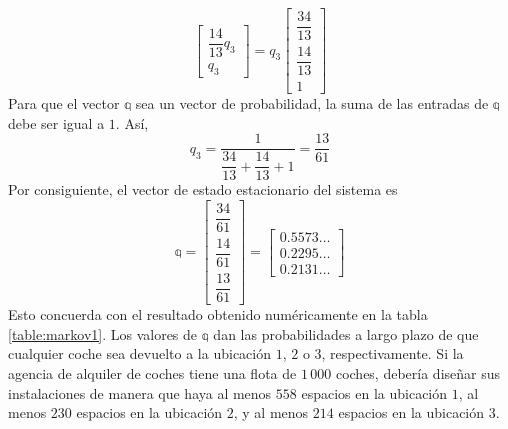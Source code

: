 \begin{example}
$$\begin{bmatrix}
        \dfrac{14}{13} q_3 \\[3mm]
        q_3
    \end{bmatrix} = q_3 \begin{bmatrix}
        \dfrac{34}{13} \\[3mm] 
        \dfrac{14}{13} \\[3mm]
        1
    \end{bmatrix}$$
    Para que el vector $\mathbb{q}$ sea un vector de probabilidad, la suma de las entradas de $\mathbb{q}$ debe ser igual a $1$. Así,
    $$q_3 = \frac{1}{\dfrac{34}{13} + \dfrac{14}{13} + 1} = \frac{13}{61}$$
    Por consiguiente, el vector de estado estacionario del sistema es
    $$\mathbb{q} = \begin{bmatrix}
        \dfrac{34}{61} \\[2mm]
        \dfrac{14}{61} \\[2mm]
        \dfrac{13}{61}
    \end{bmatrix} = \begin{bmatrix}
        0.5573 \dots \\
        0.2295 \dots \\
        0.2131 \dots
    \end{bmatrix}$$
    Esto concuerda con el resultado obtenido numéricamente en la tabla \ref{table:markov1}. Los valores de $\mathbb{q}$ dan las probabilidades a largo plazo de que cualquier coche sea devuelto a la ubicación $1$, $2$ o $3$, respectivamente. Si la agencia de alquiler de coches tiene una flota de $1 \, 000$ coches, debería diseñar sus instalaciones de manera que haya al menos $558$ espacios en la ubicación $1$, al menos $230$ espacios en la ubicación $2$, y al menos $214$ espacios en la ubicación $3$.
\end{example}

